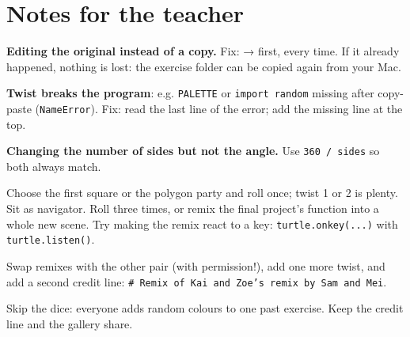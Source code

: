 \section{Notes for the teacher}
\begin{commonmistakes}
  \item \textbf{Editing the original instead of a copy.} Fix:  →  first, every time. If it already happened, nothing is lost: the exercise folder can be copied again from your Mac.
  \item \textbf{Twist breaks the program}: e.g. \texttt{PALETTE} or \texttt{import random} missing after copy-paste (\texttt{NameError}). Fix: read the last line of the error; add the missing line at the top.
  \item \textbf{Changing the number of sides but not the angle.} Use \texttt{360 / sides} so both always match.
\end{commonmistakes}
\begin{differentiation}
\supportpath Choose the first square or the polygon party and roll once; twist 1 or 2 is plenty. Sit as navigator.
\extensionpath Roll three times, or remix the final project's function into a whole new scene. Try making the remix react to a key: \texttt{turtle.onkey(...)} with \texttt{turtle.listen()}.
\end{differentiation}
\begin{stretchchallenge}
Swap remixes with the other pair (with permission!), add one more twist, and add a second credit line: \texttt{\# Remix of Kai and Zoe's remix by Sam and Mei}.
\end{stretchchallenge}
\begin{teachernote}
Skip the dice: everyone adds random colours to one past exercise. Keep the credit line and the gallery share.
\end{teachernote}
